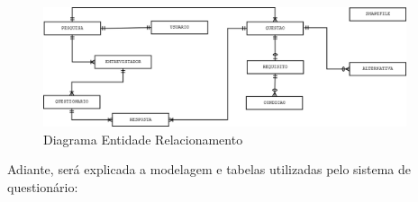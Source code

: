 \documentclass[
	12pt,				%
    oneside,			%
	a4paper,			%
	english,			%
	french,				%
	spanish,			%
	brazil,				%
	]{abntex2}
\begin{document}
\begin{figure} [H] 
\label{figura1} 
\caption{Diagrama Entidade Relacionamento}
\includegraphics[width=0.95\textwidth]{diagrama.png} %
\end{figure}

Adiante, será explicada a modelagem e tabelas utilizadas pelo sistema de questionário:
\end{document}
